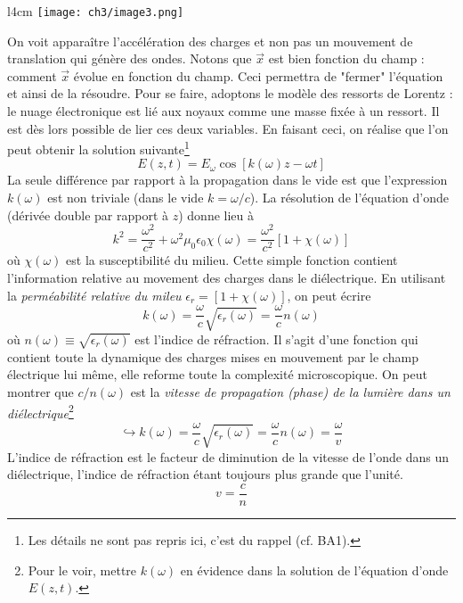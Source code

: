 \begin{wrapfigure}[8]{l}{4cm}
	\vspace{-2mm}
	\texttt{[image: ch3/image3.png]}
	\end{wrapfigure}
On voit apparaître l'accélération des charges et non pas un mouvement de translation qui génère des ondes. 
Notons que $\vec{x}$ est bien fonction du champ : comment $\vec{x}$ évolue en fonction du champ. Ceci 
permettra de "fermer" l'équation et ainsi de la résoudre. Pour se faire, adoptons le modèle des ressorts 
de Lorentz : le nuage électronique est lié aux noyaux comme une masse fixée à un ressort. Il est dès lors 
possible de lier ces deux variables. En faisant ceci, on réalise que l'on peut obtenir la solution suivante\footnote{
Les détails ne sont pas repris ici, c'est du rappel (cf. BA1).}
\begin{equation}
E(z,t) = E_\omega \cos[k(\omega)z-\omega t]
\end{equation}
La seule différence par rapport à la propagation dans le vide est que l'expression $k(\omega)$ est non 
triviale (dans le vide $k=\omega/c$). La résolution de l'équation d'onde (dérivée double par rapport à 
$z$) donne lieu à
\begin{equation}
k^2=\dfrac{\omega^2}{c^2}+\omega^2\mu_0\epsilon_0\chi(\omega) = \dfrac{\omega^2}{c^2}[1+\chi(\omega)]
\end{equation}
où $\chi(\omega)$ est la susceptibilité du milieu. Cette simple fonction contient l'information relative 
au movement des charges dans le diélectrique. En utilisant la \textit{perméabilité relative du mileu} 
$\epsilon_r = [1+\chi(\omega)]$, on peut écrire
\begin{equation}
k(\omega) = \dfrac{\omega}{c}\sqrt{\epsilon_r(\omega)} = \dfrac{\omega}{c} n(\omega)
\end{equation}
où $n(\omega) \equiv \sqrt{\epsilon_r(\omega)}$ est l'indice de réfraction. Il s'agit d'une fonction 
qui contient toute la dynamique des charges mises en mouvement par le champ électrique lui même, elle 
reforme toute la complexité microscopique. On peut montrer que $c/n(\omega)$ est la \textit{vitesse de 
propagation (phase) de la lumière dans un diélectrique}\footnote{Pour le voir, mettre $k(\omega)$ en évidence 
dans la solution de l'équation d'onde $E(z,t)$.}
\begin{equation}
\hookrightarrow k(\omega) = \dfrac{\omega}{c}\sqrt{\epsilon_r(\omega)} = \dfrac{\omega}{c} n(\omega) = 
\dfrac{\omega}{v}
\end{equation}
L'indice de réfraction est le facteur de diminution de la vitesse de l'onde dans un diélectrique, 
l'indice de réfraction étant toujours plus grande que l'unité.
\begin{equation}
v = \frac{c}{n}
\end{equation}


